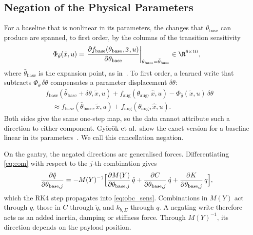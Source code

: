 \subsection{Negation of the Physical Parameters}\label{sec:obc_negation}
For a baseline that is nonlinear in its parameters, the changes that
$\theta_{\mathrm{base}}$ can produce are spanned, to first order, by the
columns of the transition sensitivity
\begin{equation}
 \Phi_{\bar\theta}(\tilde x,u)
 =\left.\frac{\partial f_{\mathrm{base}}(\theta_{\mathrm{base}},\tilde x,u)}
   {\partial\theta_{\mathrm{base}}}\right|_{\theta_{\mathrm{base}}=\bar\theta_{\mathrm{base}}}
   \in\R^{6\times10},
\label{eq:obc_sens}
\end{equation}
where $\bar\theta_{\mathrm{base}}$ is the expansion point, as
in~\cite[Eq.~(15)]{gyorok2025l4dc}.
To first order, a learned write that subtracts
$\Phi_{\bar\theta}\,\delta\theta$ compensates a parameter displacement
$\delta\theta$:
\begin{equation}
\begin{aligned}
 &f_{\mathrm{base}}(\bar\theta_{\mathrm{base}}+\delta\theta,\tilde x,u)
 +f_{\mathrm{aug}}(\theta_{\mathrm{aug}},\hat x,u)
 -\Phi_{\bar\theta}(\tilde x,u)\,\delta\theta\\
 &\quad\approx f_{\mathrm{base}}(\bar\theta_{\mathrm{base}},\tilde x,u)
 +f_{\mathrm{aug}}(\theta_{\mathrm{aug}},\hat x,u).
\end{aligned}
\label{eq:obc_negation}
\end{equation}
Both sides give the same one-step map, so the data cannot attribute such a
direction to either component.
Gy\"or\"ok et al.\ show the exact version for a baseline linear in its
parameters~\cite[Ex.~1]{gyorok2025l4dc}.
We call this cancellation negation.

On the gantry, the negated directions are generalised forces.
Differentiating \eqref{eq:eom} with respect to the $j$-th combination gives
\begin{equation}
 \frac{\partial\ddot q}{\partial\theta_{\mathrm{base},j}}
 =-M(Y)^{-1}\Bigl[\frac{\partial M(Y)}{\partial\theta_{\mathrm{base},j}}\,\ddot q
 +\frac{\partial C}{\partial\theta_{\mathrm{base},j}}\,\dot q
 +\frac{\partial K}{\partial\theta_{\mathrm{base},j}}\,q\Bigr],
\label{eq:obc_gantry_sens}
\end{equation}
which the RK4 step propagates into \eqref{eq:obc_sens}.
Combinations in $M(Y)$ act through $\ddot q$, those in $C$ through $\dot q$,
and $k_{b,\Sigma}$ through $q$.
A negating write therefore acts as an added inertia, damping or stiffness
force.
Through $M(Y)^{-1}$, its direction depends on the payload position.

